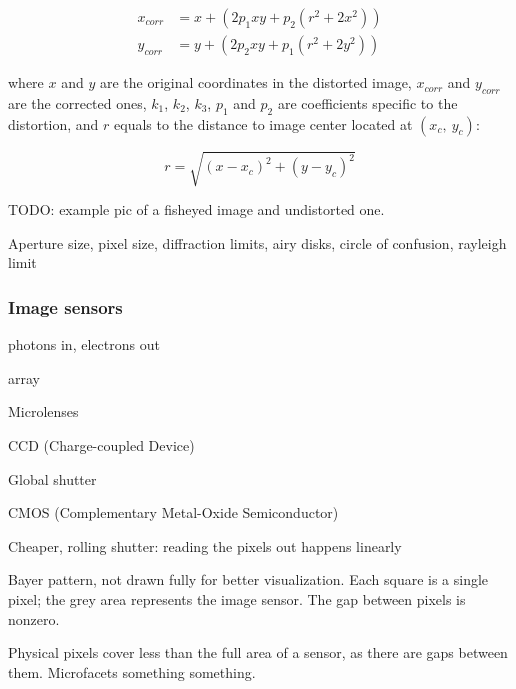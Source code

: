 \begin{align}
x_{corr} &= x + (2 p_1 x y + p_2 (r^2 + 2 x^2))\\
y_{corr} &= y + (2 p_2 x y + p_1 (r^2 + 2 y^2))
\end{align}

where $x$ and $y$ are the original coordinates in the distorted image, $x_{corr}$ and $y_{corr}$ are the corrected ones, $k_1$, $k_2$, $k_3$, $p_1$ and $p_2$ are coefficients specific to the distortion, and $r$ equals to the distance to image center located at $(x_c,~y_c)$:

\begin{equation}
r = \sqrt{(x - x_c)^2 + (y - y_c)^2}
\end{equation}

TODO: example pic of a fisheyed image and undistorted one.


Aperture size, pixel size, diffraction limits, airy disks, circle of confusion, rayleigh limit

\subsubsection{Image sensors}

photons in, electrons out

array

Microlenses

CCD (Charge-coupled Device)

Global shutter

CMOS (Complementary Metal-Oxide Semiconductor)

Cheaper, rolling shutter: reading the pixels out happens linearly


{Bayer pattern, not drawn fully for better visualization. Each square is a single pixel; the grey area represents the image sensor. The gap between pixels is nonzero.}

Physical pixels cover less than the full area of a sensor, as there are gaps between them. Microfacets something something.


